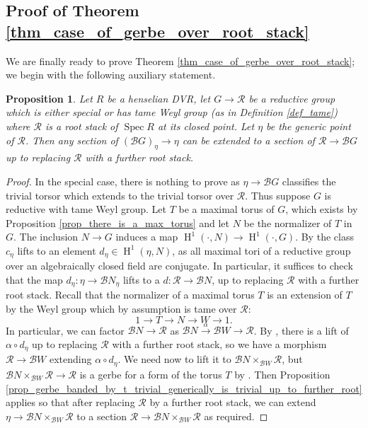 \documentclass{amsart}
\newtheorem{proposition}[proposition]{Proposition}
\theoremstyle{definition}
\newcommand{\cB}{\mathcal{B}}
\newcommand{\oH}{\operatorname{H}}
\newcommand{\cR}{\mathcal{R}}
\newcommand{\spec}{\operatorname{Spec}}
\begin{document}
\subsection{Proof of Theorem \ref{thm_case_of_gerbe_over_root_stack}}
We are finally ready to prove Theorem \ref{thm_case_of_gerbe_over_root_stack}; we begin with the following auxiliary statement.
\begin{proposition}\label{prop_case_BG}
    Let $R$ be a henselian DVR, let $G\to \cR$ be a reductive group which is either special or has tame Weyl group (as in Definition \ref{def_tame}) where $\cR$ is a root stack of $\spec R$ at its closed point. Let $\eta$ be the generic point of $\cR$. Then any section of $(\cB G)_\eta\to \eta$ can be extended to a section of $\cR\to \cB G$ up to replacing $\cR$ with a further root stack. 
\end{proposition}

\begin{proof} In the special case, there is nothing to prove as $\eta \to \cB G$ classifies the trivial torsor which extends to the trivial torsor over $\cR$. Thus suppose $G$ is reductive with tame Weyl group. Let $T$ be a maximal torus of $G$, which exists by Proposition \ref{prop_there_is_a_max_torus} and let $N$ be the normalizer of $T$ in $G$. The inclusion $N\to G$ induces a map $\oH^1(\cdot, N)\to \oH^1(\cdot, G)$. By \cite[Lemma III.2.2.1 (b)]{serre1979galois} the class $c_\eta$ lifts to an element $d_\eta\in \oH^1(\eta, N)$, as all maximal tori of a reductive group over an algebraically closed field are conjugate.
In particular, it suffices to check that the map $d_\eta:\eta\to \cB N_\eta$ lifts to a $d:\cR\to \cB N$, up to replacing $\cR$ with a further root stack.
Recall that the normalizer of a maximal torus $T$ is an extension of $T$ by the Weyl group which by assumption is tame over $\cR$:
\[
1\to T \to N \to  W\to 1.
\]In particular, we can factor $\cB N\to \cR$ as $\cB N\xrightarrow{\alpha} \cB W \to \cR$. By \cite{bresciani2024arithmetic}, there is a lift of $\alpha\circ d_\eta$ up to replacing $\cR$ with a further root stack, so we have a morphism $\cR\to \cB W$ extending $\alpha\circ d_\eta$. We need now to lift it to $\cB N\times_{\cB W}\cR$, but $\cB N\times_{\cB W}\cR\to \cR$ is a gerbe for a form of the torus $T$ by \cite[\href{https://stacks.math.columbia.edu/tag/0CJY}{Tag 0CJY}]{stacks-project}. Then Proposition \ref{prop_gerbe_banded_by_t_trivial_generically_is_trivial_up_to_further_root} applies so that after replacing $\cR$ by a further root stack, we can extend $\eta \to \cB N \times_{\cB W} \cR$ to a section $\cR \to \cB N \times_{\cB W} \cR$ as required.
\end{proof}
\end{document}
